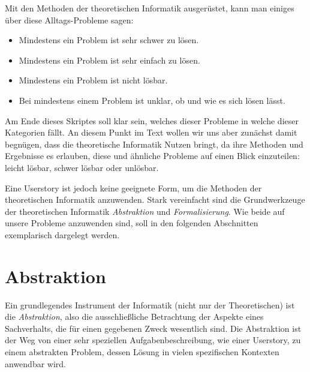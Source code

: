 Mit den Methoden der theoretischen Informatik ausgerüstet,
kann man einiges über diese Alltags-Probleme sagen:
\begin{itemize}
    \item Mindestens ein Problem ist sehr schwer zu lösen.
    \item Mindestens ein Problem ist sehr einfach zu lösen.
    \item Mindestens ein Problem ist nicht lösbar.
    \item Bei mindestens einem Problem ist unklar, ob und wie es sich lösen lässt.
\end{itemize}

Am Ende dieses Skriptes soll klar sein,
welches dieser Probleme in welche dieser Kategorien fällt.
An diesem Punkt im Text wollen wir uns aber zunächst damit begnügen,
dass die theoretische Informatik Nutzen bringt,
da ihre Methoden und Ergebnisse es erlauben,
diese und ähnliche Probleme auf einen Blick einzuteilen:
leicht lösbar, schwer lösbar oder unlösbar.

Eine Userstory ist jedoch keine geeignete Form,
um die Methoden der theoretischen Informatik anzuwenden.
Stark vereinfacht sind die Grundwerkzeuge der theoretischen Informatik
\emph{Abstraktion} und \emph{Formalisierung}.
Wie beide auf unsere Probleme anzuwenden sind,
soll in den folgenden Abschnitten exemplarisch dargelegt werden.

\section{Abstraktion}

Ein grundlegendes Instrument der Informatik (nicht nur der Theoretischen) 
ist die \emph{Abstraktion},
also die ausschließliche Betrachtung der Aspekte eines Sachverhalts,
die für einen gegebenen Zweck wesentlich sind.
Die Abstraktion ist der Weg von einer sehr speziellen Aufgabenbeschreibung,
wie einer Userstory, zu einem abstrakten Problem,
dessen Lösung in vielen spezifischen Kontexten anwendbar wird.

